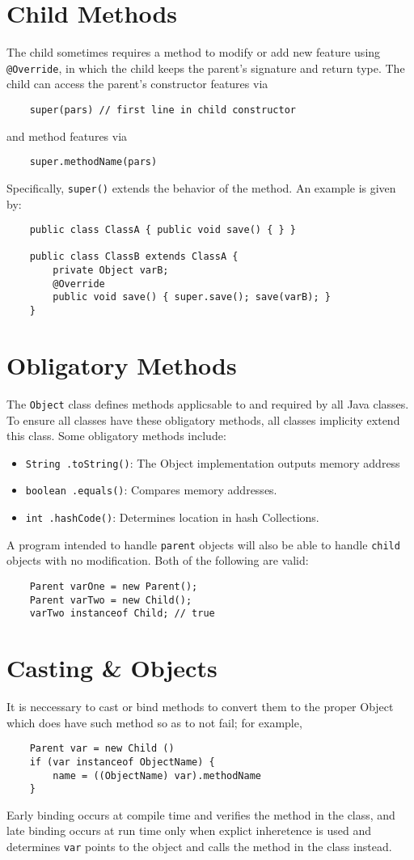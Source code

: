 \documentclass[letterpaper, openany, justified]{tufte-book}
\newcommand{\cd}[1]{\lstinline{#1}}
\begin{document}
\begin{fullwidth}
\section{Child Methods}
The child sometimes requires a method to modify or add new feature using \cd{@Override}, in which the child keeps the parent's signature and return type. The child can access the parent's constructor features via
\begin{lstlisting}
    super(pars) // first line in child constructor
\end{lstlisting}
and method features via
\begin{lstlisting}
    super.methodName(pars)
\end{lstlisting}
Specifically, \cd{super()} extends the behavior of the method. An example is given by:
\begin{lstlisting}
    public class ClassA { public void save() { } }

    public class ClassB extends ClassA {
        private Object varB;
        @Override
        public void save() { super.save(); save(varB); }
    }
\end{lstlisting}

\section{Obligatory Methods}
The \cd{Object} class defines methods applicsable to and required by all Java classes. To ensure all classes have these obligatory methods, all classes implicity extend this class. Some obligatory methods include:
\begin{itemize}
    \item \cd{String .toString()}: The Object implementation outputs memory address
    \item \cd{boolean .equals()}: Compares memory addresses.
    \item \cd{int .hashCode()}: Determines location in hash Collections.
\end{itemize}
A program intended to handle \cd{parent} objects will also be able to handle \cd{child} objects with no modification. Both of the following are valid:
\begin{lstlisting}
    Parent varOne = new Parent();
    Parent varTwo = new Child();
    varTwo instanceof Child; // true
\end{lstlisting}

\section{Casting \& Objects}
It is neccessary to cast or bind methods to convert them to the proper Object which does have such method so as to not fail; for example,
\begin{lstlisting}
    Parent var = new Child ()
    if (var instanceof ObjectName) {
        name = ((ObjectName) var).methodName
    }
\end{lstlisting}
Early binding occurs at compile time and verifies the method in the class, and late binding occurs at run time only when explict inheretence is used and determines \cd{var} points to the object and calls the method in the class instead.


\end{fullwidth}
\end{document}
